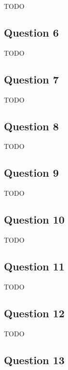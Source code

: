 \documentclass[12pt, letterpaper, oneside]{book}
\begin{document}
TODO

\subsection{Question 6}

TODO

\subsection{Question 7}

TODO

\subsection{Question 8}

TODO

\subsection{Question 9}

TODO

\subsection{Question 10}

TODO

\subsection{Question 11}

TODO

\subsection{Question 12}

TODO

\subsection{Question 13}
\end{document}
